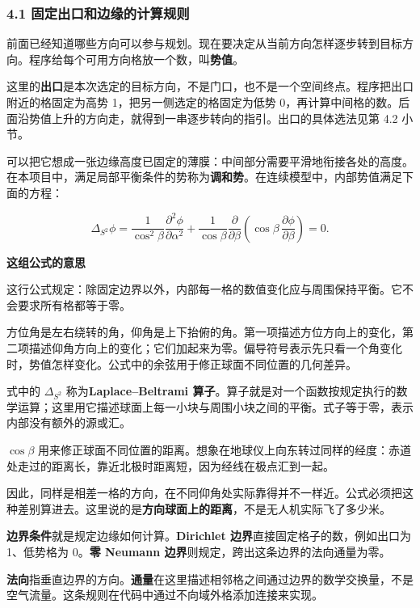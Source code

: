 \documentclass[12pt,a4paper]{article}
\numberwithin{equation}{topic}
\begin{document}
\subsubsection*{4.1 固定出口和边缘的计算规则}

前面已经知道哪些方向可以参与规划。现在要决定从当前方向怎样逐步转到目标方向。程序给每个可用方向格放一个数，叫\textbf{势值}。

这里的\textbf{出口}是本次选定的目标方向，不是门口，也不是一个空间终点。程序把出口附近的格固定为高势 1，把另一侧选定的格固定为低势 0，再计算中间格的数。后面沿势值上升的方向走，就得到一串逐步转向的指引。出口的具体选法见第 4.2 小节。

可以把它想成一张边缘高度已固定的薄膜：中间部分需要平滑地衔接各处的高度。在本项目中，满足局部平衡条件的势称为\textbf{调和势}。在连续模型中，内部势值满足下面的方程：

\begin{equation}
\label{eq:laplace}
\Delta_{S^2}\phi
=\frac{1}{\cos^2\beta}\frac{\partial^2\phi}{\partial\alpha^2}
+\frac{1}{\cos\beta}\frac{\partial}{\partial\beta}
\left(\cos\beta\,\frac{\partial\phi}{\partial\beta}\right)=0.
\end{equation}

\noindent\textbf{这组公式的意思}\par\nobreak
这行公式规定：除固定边界以外，内部每一格的数值变化应与周围保持平衡。它不会要求所有格都等于零。

方位角是左右绕转的角，仰角是上下抬俯的角。第一项描述方位方向上的变化，第二项描述仰角方向上的变化；它们加起来为零。偏导符号表示先只看一个角变化时，势值怎样变化。公式中的余弦用于修正球面不同位置的几何差异。


式中的 \(\Delta_{S^2}\) 称为\textbf{Laplace–Beltrami 算子}。算子就是对一个函数按规定执行的数学运算；这里用它描述球面上每一小块与周围小块之间的平衡。式子等于零，表示内部没有额外的源或汇。

\(\cos\beta\) 用来修正球面不同位置的距离。想象在地球仪上向东转过同样的经度：赤道处走过的距离长，靠近北极时距离短，因为经线在极点汇到一起。

因此，同样是相差一格的方向，在不同仰角处实际靠得并不一样近。公式必须把这种差别算进去。这里说的是\textbf{方向球面上的距离}，不是无人机实际飞了多少米。

\textbf{边界条件}就是规定边缘如何计算。\textbf{Dirichlet 边界}直接固定格子的数，例如出口为 1、低势格为 0。\textbf{零 Neumann 边界}则规定，跨出这条边界的法向通量为零。

\textbf{法向}指垂直边界的方向。\textbf{通量}在这里描述相邻格之间通过边界的数学交换量，不是空气流量。这条规则在代码中通过不向域外格添加连接来实现。
\end{document}
